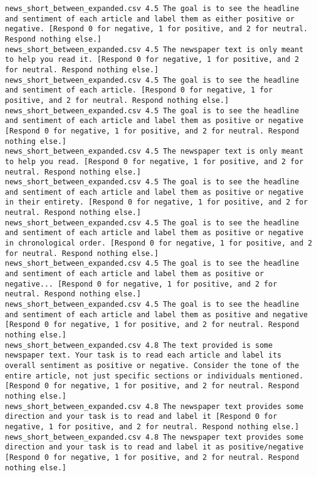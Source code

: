 \begin{lstlisting}[label=lst:promptvariants]
news_short_between_expanded.csv	4.5	The goal is to see the headline and sentiment of each article and label them as either positive or negative. [Respond 0 for negative, 1 for positive, and 2 for neutral. Respond nothing else.]
news_short_between_expanded.csv	4.5	The newspaper text is only meant to help you read it. [Respond 0 for negative, 1 for positive, and 2 for neutral. Respond nothing else.]
news_short_between_expanded.csv	4.5	The goal is to see the headline and sentiment of each article. [Respond 0 for negative, 1 for positive, and 2 for neutral. Respond nothing else.]
news_short_between_expanded.csv	4.5	The goal is to see the headline and sentiment of each article and label them as positive or negative [Respond 0 for negative, 1 for positive, and 2 for neutral. Respond nothing else.]
news_short_between_expanded.csv	4.5	The newspaper text is only meant to help you read. [Respond 0 for negative, 1 for positive, and 2 for neutral. Respond nothing else.]
news_short_between_expanded.csv	4.5	The goal is to see the headline and sentiment of each article and label them as positive or negative in their entirety. [Respond 0 for negative, 1 for positive, and 2 for neutral. Respond nothing else.]
news_short_between_expanded.csv	4.5	The goal is to see the headline and sentiment of each article and label them as positive or negative in chronological order. [Respond 0 for negative, 1 for positive, and 2 for neutral. Respond nothing else.]
news_short_between_expanded.csv	4.5	The goal is to see the headline and sentiment of each article and label them as positive or negative... [Respond 0 for negative, 1 for positive, and 2 for neutral. Respond nothing else.]
news_short_between_expanded.csv	4.5	The goal is to see the headline and sentiment of each article and label them as positive and negative [Respond 0 for negative, 1 for positive, and 2 for neutral. Respond nothing else.]
news_short_between_expanded.csv	4.8	The text provided is some newspaper text. Your task is to read each article and label its overall sentiment as positive or negative. Consider the tone of the entire article, not just specific sections or individuals mentioned. [Respond 0 for negative, 1 for positive, and 2 for neutral. Respond nothing else.]
news_short_between_expanded.csv	4.8	The newspaper text provides some direction and your task is to read and label it [Respond 0 for negative, 1 for positive, and 2 for neutral. Respond nothing else.]
news_short_between_expanded.csv	4.8	The newspaper text provides some direction and your task is to read and label it as positive/negative [Respond 0 for negative, 1 for positive, and 2 for neutral. Respond nothing else.]

\end{lstlisting}
